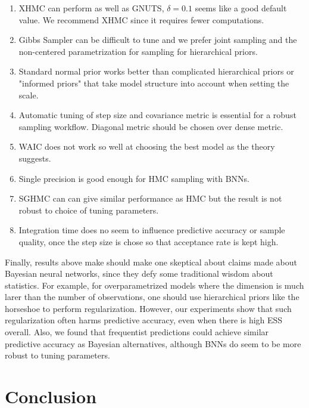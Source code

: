 \documentclass[12pt]{report}
\begin{document}
\begin{enumerate}
\item XHMC can perform as well as GNUTS, $\delta = 0.1$ seems like a good default value. We recommend XHMC since it requires fewer computations. 

\item Gibbs Sampler can be difficult to tune and we prefer joint sampling and the non-centered parametrization for sampling for hierarchical priors.

\item Standard normal prior works better than complicated hierarchical priors or "informed priors" that take model structure into account when setting the scale.

\item Automatic tuning of step size and covariance metric is essential for a robust sampling workflow. Diagonal metric should be chosen over dense metric.

\item WAIC does not work so well at choosing the best model as the theory suggests. 

\item Single precision is good enough for HMC sampling with BNNs. 

\item  SGHMC can can give similar performance as HMC but the result is not robust to choice of tuning parameters.

\item Integration time does no seem to influence predictive accuracy or sample quality, once the step size is chose so that acceptance rate is kept high.

\end{enumerate}

Finally, results above make should make one skeptical about claims made about Bayesian neural networks, since they defy some traditional wisdom about statistics. For example, for overparametrized models where the dimension is much larer than the number of observations, one should use hierarchical priors like the horseshoe to perform regularization. However, our experiments show that such regularization often harms predictive accuracy, even when there is high ESS overall. Also, we found that frequentist predictions could achieve similar predictive accuracy as Bayesian alternatives, although BNNs do seem to be more robust to tuning parameters.



\chapter{Conclusion}
\end{document}
